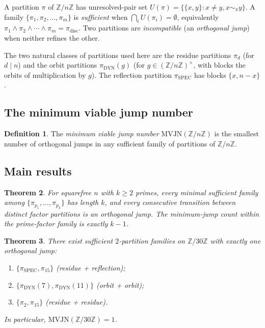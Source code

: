 \documentclass[11pt,reqno]{amsart}
\theoremstyle{plain}
\newtheorem{theorem}{Theorem}
\theoremstyle{definition}
\newtheorem{definition}[theorem]{Definition}
\newcommand{\Z}{\mathbb{Z}}
\newcommand{\Zn}{\Z/n\Z}
\newcommand{\Zns}{(\Z/n\Z)^{\times}}
\newcommand{\meet}{\wedge}
\newcommand{\disc}{\mathrm{disc}}
\newcommand{\DYN}{\mathrm{DYN}}
\newcommand{\SPEC}{\mathrm{SPEC}}
\begin{document}
A partition $\pi$ of $\Zn$ has unresolved-pair set $U(\pi) = \{\{x,y\} : x \neq y, x \sim_{\pi} y\}$. A family $\{\pi_1, \pi_2, \ldots, \pi_m\}$ is \emph{sufficient} when $\bigcap_i U(\pi_i) = \emptyset$, equivalently $\pi_1 \meet \pi_2 \meet \cdots \meet \pi_m = \pi_{\disc}$. Two partitions are \emph{incompatible} (an \emph{orthogonal jump}) when neither refines the other.

The two natural classes of partitions used here are the residue partitions $\pi_d$ (for $d \mid n$) and the orbit partitions $\pi_{\DYN}(g)$ (for $g \in \Zns$, with blocks the orbits of multiplication by $g$). The reflection partition $\pi_{\SPEC}$ has blocks $\{x, n-x\}$.

\subsection{The minimum viable jump number}

\begin{definition}
The \emph{minimum viable jump number} $\mathrm{MVJN}(\Zn)$ is the smallest number of orthogonal jumps in any sufficient family of partitions of $\Zn$.
\end{definition}

\subsection{Main results}

\begin{theorem} \label{thm:rigid}
For squarefree $n$ with $k \geq 2$ primes, every minimal sufficient family among $\{\pi_{p_1}, \ldots, \pi_{p_k}\}$ has length $k$, and every consecutive transition between distinct factor partitions is an orthogonal jump. The minimum-jump count within the prime-factor family is exactly $k-1$.
\end{theorem}

\begin{theorem} \label{thm:n30}
There exist sufficient $2$-partition families on $\Z/30\Z$ with exactly one orthogonal jump:
\begin{enumerate}[label=(\alph*)]
\item $\{\pi_{\SPEC}, \pi_{15}\}$ (residue + reflection);
\item $\{\pi_{\DYN}(7), \pi_{\DYN}(11)\}$ (orbit + orbit);
\item $\{\pi_2, \pi_{15}\}$ (residue + residue).
\end{enumerate}
In particular, $\mathrm{MVJN}(\Z/30\Z) = 1$.
\end{theorem}
\end{document}
